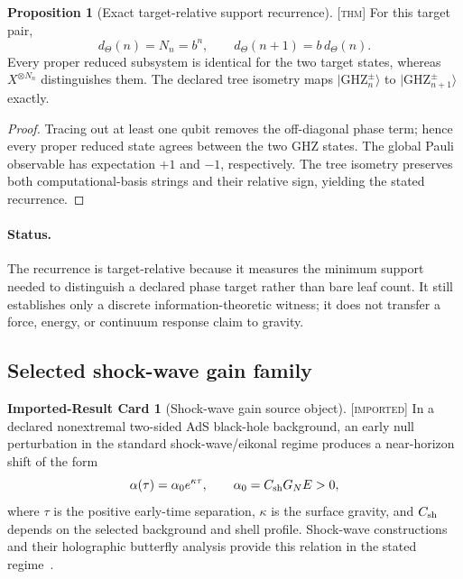 \documentclass[11pt]{article}
\newcommand{\Thm}{\textsc{[thm]}}
\newcommand{\Imp}{\textsc{[imported]}}
\theoremstyle{definition}
\newtheorem{sproposition}{Proposition}
\newtheorem{scard}{Imported-Result Card}
\begin{document}
\begin{sproposition}[Exact target-relative support recurrence]
\label{prop:ghz-support-recurrence}
\Thm{} For this target pair,
\begin{equation}
d_{\Theta}(n)=N_n=b^n,
\qquad d_{\Theta}(n+1)=b\,d_{\Theta}(n).
\label{eq:ghz-support-recurrence}
\end{equation}
Every proper reduced subsystem is identical for the two target states, whereas
$X^{\otimes N_n}$ distinguishes them.  The declared tree isometry maps
$|\mathrm{GHZ}^{\pm}_n\rangle$ to
$|\mathrm{GHZ}^{\pm}_{n+1}\rangle$ exactly.
\end{sproposition}

\begin{proof}
Tracing out at least one qubit removes the off-diagonal phase term; hence every
proper reduced state agrees between the two GHZ states.  The global Pauli
observable has expectation $+1$ and $-1$, respectively.  The tree isometry
preserves both computational-basis strings and their relative sign, yielding
the stated recurrence.
\end{proof}

\paragraph{Status.}
The recurrence is target-relative because it measures the minimum support
needed to distinguish a declared phase target rather than bare leaf count.  It
still establishes only a discrete information-theoretic witness; it does not
transfer a force, energy, or continuum response claim to gravity.

\subsection{Selected shock-wave gain family}
\label{supp:shock-realization}

\begin{scard}[Shock-wave gain source object]
\label{card:shock-gain-source}
\Imp{} In a declared nonextremal two-sided AdS black-hole background, an early
null perturbation in the standard shock-wave/eikonal regime produces a
near-horizon shift of the form
\begin{equation}
\alpha(\tau)=\alpha_0e^{\kappa\tau},
\qquad \alpha_0=C_{\rm sh}G_NE>0,
\label{eq:shock-shift}
\end{equation}
where $\tau$ is the positive early-time separation, $\kappa$ is the surface
gravity, and $C_{\rm sh}$ depends on the selected background and shell profile.
Shock-wave constructions and their holographic butterfly analysis provide this
relation in the stated regime~\cite{S_DraytHooft1985,S_ShenkerStanford2014,S_ShenkerStanford2014Multiple}.
\end{scard}
\end{document}
